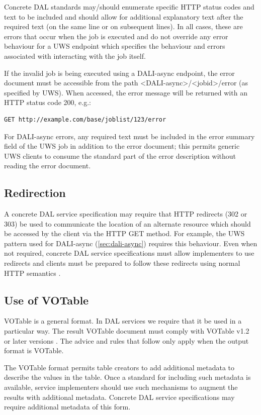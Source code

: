 \documentclass[11pt,letter]{ivoa}
\begin{document}
Concrete DAL standards may/should enumerate specific HTTP status codes and text to be included
and should allow for additional explanatory text after the required text (on the same line or
on subsequent lines). In all cases, these are errors that occur when the job is executed and
do not override any error behaviour for a UWS endpoint which specifies the behaviour and errors
associated with interacting with the job itself.

If the invalid job is being executed using a DALI-async endpoint, the error
document must be accessible from the path <DALI-async>/<jobid>/error
(as specified by UWS).  When accessed, the error message will be returned with
an HTTP status code 200, e.g.:

\begin{verbatim}
GET http://example.com/base/joblist/123/error
\end{verbatim}

For DALI-async errors, any required text must be included in the error summary field
of the UWS job in addition to the error document; this permits generic UWS clients
to consume the standard part of the error description without reading the error document.

\subsection{Redirection}
\label{sec:redirects}
A concrete DAL service specification may require that HTTP redirects (302 or
303) be used to communicate the location of an alternate resource which should
be accessed by the client via the HTTP GET method. For example, the UWS pattern
used for DALI-async (\ref{sec:dali-async}) requires this behaviour. Even when not
required, concrete DAL service specifications must allow implementers to use
redirects and clients must be prepared to follow these redirects using normal
HTTP semantics \citep{std:HTTP}.

\subsection{Use of VOTable}
\label{sec:use-votable}
VOTable is a general format. In DAL services we require that it be used in a
particular way. The result VOTable document must comply with VOTable
v1.2 or later versions
\citep{2019ivoa.spec.1021O}. The advice and rules that follow only apply
when the output format is VOTable.

The VOTable format permits table creators to add additional metadata to describe
the values in the table. Once a standard for including such metadata is
available, service implementers should use such mechanisms to augment the
results with additional metadata. Concrete DAL service specifications may
require additional metadata of this form.
\end{document}
